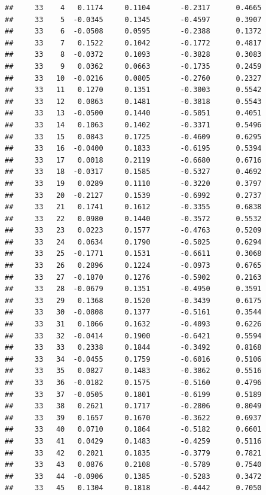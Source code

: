 \documentclass[
]{article}
\begin{document}
\begin{verbatim}
##     33    4   0.1174     0.1104       -0.2317      0.4665  
##     33    5  -0.0345     0.1345       -0.4597      0.3907  
##     33    6  -0.0508     0.0595       -0.2388      0.1372  
##     33    7   0.1522     0.1042       -0.1772      0.4817  
##     33    8  -0.0372     0.1093       -0.3828      0.3083  
##     33    9   0.0362     0.0663       -0.1735      0.2459  
##     33   10  -0.0216     0.0805       -0.2760      0.2327  
##     33   11   0.1270     0.1351       -0.3003      0.5542  
##     33   12   0.0863     0.1481       -0.3818      0.5543  
##     33   13  -0.0500     0.1440       -0.5051      0.4051  
##     33   14   0.1063     0.1402       -0.3371      0.5496  
##     33   15   0.0843     0.1725       -0.4609      0.6295  
##     33   16  -0.0400     0.1833       -0.6195      0.5394  
##     33   17   0.0018     0.2119       -0.6680      0.6716  
##     33   18  -0.0317     0.1585       -0.5327      0.4692  
##     33   19   0.0289     0.1110       -0.3220      0.3797  
##     33   20  -0.2127     0.1539       -0.6992      0.2737  
##     33   21   0.1741     0.1612       -0.3355      0.6838  
##     33   22   0.0980     0.1440       -0.3572      0.5532  
##     33   23   0.0223     0.1577       -0.4763      0.5209  
##     33   24   0.0634     0.1790       -0.5025      0.6294  
##     33   25  -0.1771     0.1531       -0.6611      0.3068  
##     33   26   0.2896     0.1224       -0.0973      0.6765  
##     33   27  -0.1870     0.1276       -0.5902      0.2163  
##     33   28  -0.0679     0.1351       -0.4950      0.3591  
##     33   29   0.1368     0.1520       -0.3439      0.6175  
##     33   30  -0.0808     0.1377       -0.5161      0.3544  
##     33   31   0.1066     0.1632       -0.4093      0.6226  
##     33   32  -0.0414     0.1900       -0.6421      0.5594  
##     33   33   0.2338     0.1844       -0.3492      0.8168  
##     33   34  -0.0455     0.1759       -0.6016      0.5106  
##     33   35   0.0827     0.1483       -0.3862      0.5516  
##     33   36  -0.0182     0.1575       -0.5160      0.4796  
##     33   37  -0.0505     0.1801       -0.6199      0.5189  
##     33   38   0.2621     0.1717       -0.2806      0.8049  
##     33   39   0.1657     0.1670       -0.3622      0.6937  
##     33   40   0.0710     0.1864       -0.5182      0.6601  
##     33   41   0.0429     0.1483       -0.4259      0.5116  
##     33   42   0.2021     0.1835       -0.3779      0.7821  
##     33   43   0.0876     0.2108       -0.5789      0.7540  
##     33   44  -0.0906     0.1385       -0.5283      0.3472  
##     33   45   0.1304     0.1818       -0.4442      0.7050  

\end{verbatim}
\end{document}
